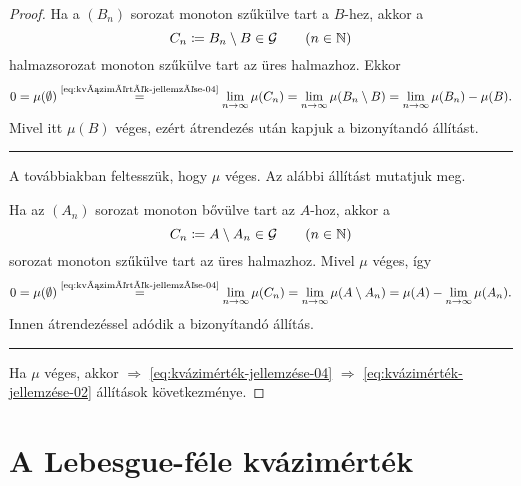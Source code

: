 \documentclass[
]{elteikthesis}[2024/04/26]
\begin{document}
\begin{proof}
		\fbox{\ref{eq:kvázimérték-jellemzése-04} \( \Longrightarrow \)
			  \ref{eq:kvázimérték-jellemzése-03}}
		Ha a \( (B_n) \) sorozat monoton szűkülve tart a \( B \)-hez, akkor a
		\[
			C_n \coloneq B_n \setminus B \in \mathcal{G} \qquad (n \in \mathbb{N})
		\]
		halmazsorozat monoton szűkülve tart az üres halmazhoz.
		Ekkor
		\[
			0 = 
			\mu( \emptyset ) \overset{\text{\ref{eq:kvázimérték-jellemzése-04}}}{=}
			\lim_{n \to \infty} \mu( C_n ) =
			\lim_{n \to \infty} \mu( B_n \setminus B ) =
			\lim_{n \to \infty} \mu( B_n ) - \mu(B).
		\]
		Mivel itt \( \mu(B) \) véges, ezért átrendezés után kapjuk a bizonyítandó állítást.
		
		\vspace{9pt}
		\hrule
		\vspace{9pt}
		
		A továbbiakban feltesszük, hogy \( \mu \) véges. Az alábbi állítást mutatjuk meg.
		
		\vspace{3pt}
		
		\fbox{\ref{eq:kvázimérték-jellemzése-04} \( \Longrightarrow \)
			  \ref{eq:kvázimérték-jellemzése-02}}
		Ha az \( (A_n) \) sorozat monoton bővülve tart az \( A \)-hoz, akkor a
		\[
			C_n \coloneq A \setminus A_n \in \mathcal{G} \qquad (n \in \mathbb{N})
		\]
		sorozat monoton szűkülve tart az üres halmazhoz.
		Mivel \( \mu \) véges, így
		\[
			0 = 
			\mu( \emptyset ) \overset{\text{\ref{eq:kvázimérték-jellemzése-04}}}{=}
			\lim_{n \to \infty} \mu( C_n ) =
			\lim_{n \to \infty} \mu( A \setminus A_n ) =
			\mu( A ) - \lim_{n \to \infty} \mu( A_n ).
		\]
		Innen átrendezéssel adódik a bizonyítandó állítás.
		
		\vspace{9pt}
		\hrule
		\vspace{9pt}
		
		\fbox{\ref{eq:kvázimérték-jellemzése-03} \( \Longrightarrow \)
			  \ref{eq:kvázimérték-jellemzése-02}}
		Ha \( \mu \) véges, akkor
		 \( \Longrightarrow \)
		 \ref{eq:kvázimérték-jellemzése-04} \( \Longrightarrow \)
		 \ref{eq:kvázimérték-jellemzése-02}
		állítások következménye.
		
	\end{proof}
	
	\newpage
	\section{A Lebesgue-féle kvázimérték}
	
\end{document}
